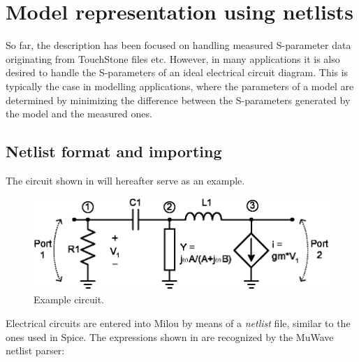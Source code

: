 %
%
\section{Model representation using netlists}\label{sec:mna}
So far, the description has been focused on handling measured
S-parameter data originating from TouchStone files etc. However,
in many applications it is also desired to handle the S-parameters
of an ideal electrical circuit diagram. This is typically the case
in modelling applications, where the parameters of a model are
determined by minimizing the difference between the S-parameters
generated by the model and the measured ones.

\subsection{Netlist format and importing}
The circuit shown in  will hereafter serve as an
example.

\begin{figure}[htbf]
    \centering
  \includegraphics[scale=0.85]{Figures/Circuit.eps}
  \caption{Example circuit.}\label{fig:Circuit}
\end{figure}

Electrical circuits are entered into Milou by means of a
\emph{netlist} file, similar to the ones used in Spice. The
expressions shown in  are recognized by the MuWave
netlist parser:

